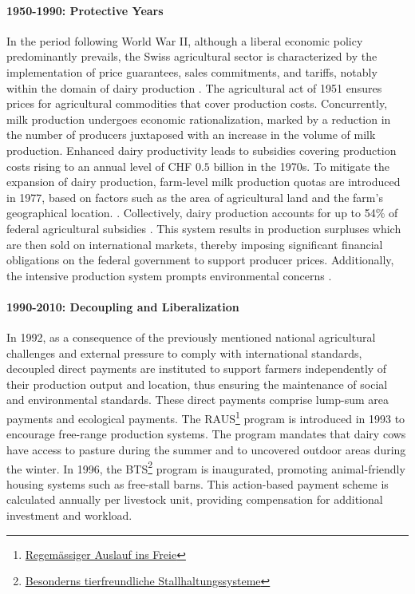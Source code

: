 \paragraph{1950-1990: Protective Years}
In the period following World War II, although a liberal economic policy predominantly prevails, the Swiss agricultural sector is characterized by the implementation of price guarantees, sales commitments, and tariffs, notably within the domain of dairy production \citep{huber_lessons_2023}. The agricultural act of 1951 ensures prices for agricultural commodities that cover production costs. Concurrently, milk production undergoes economic rationalization, marked by a reduction in the number of producers juxtaposed with an increase in the volume of milk production. Enhanced dairy productivity leads to subsidies covering production costs rising to an annual level of CHF $0.5$ billion in the 1970s. To mitigate the expansion of dairy production, farm-level milk production quotas are introduced in 1977, based on factors such as the area of agricultural land and the farm's geographical location. \citep{huber_lessons_2023}. Collectively, dairy production accounts for up to 54\% of federal agricultural subsidies \citep{milchwirtschaft_2015}. This system results in production surpluses which are then sold on international markets, thereby imposing significant financial obligations on the federal government to support producer prices. Additionally, the intensive production system prompts environmental concerns \citep{huber_lessons_2023}.

\paragraph*{1990-2010: Decoupling and Liberalization}
In 1992, as a consequence of the previously mentioned national agricultural challenges and external pressure to comply with international standards, decoupled direct payments are instituted to support farmers independently of their production output and location, thus ensuring the maintenance of social and environmental standards. These direct payments comprise lump-sum area payments and ecological payments. The RAUS\footnote{\href{https://www.blw.admin.ch/blw/de/home/instrumente/direktzahlungen/produktionssystembeitraege23/tierwohlbeitraege1.html}{Regemässiger Auslauf ins Freie}} program is introduced in 1993 to encourage free-range production systems. The program mandates that dairy cows have access to pasture during the summer and to uncovered outdoor areas during the winter. In 1996, the BTS\footnote{\href{https://www.blw.admin.ch/blw/de/home/instrumente/direktzahlungen/produktionssystembeitraege23/tierwohlbeitraege1.html}{Besonderns tierfreundliche Stallhaltungssysteme}} program is inaugurated, promoting animal-friendly housing systems such as free-stall barns. This action-based payment scheme is calculated annually per livestock unit, providing compensation for additional investment and workload.

